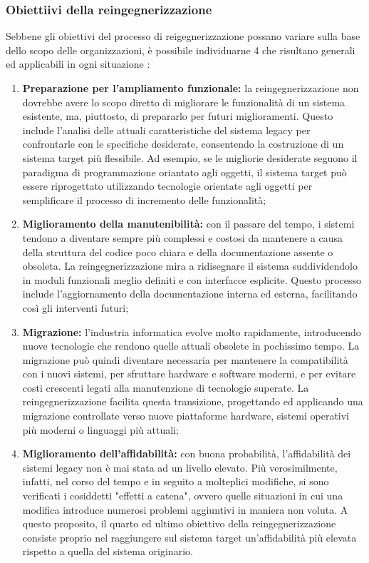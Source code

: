 \subsubsection{Obiettiivi della reingegnerizzazione}
Sebbene gli obiettivi del processo di reigegnerizzazione possano variare sulla base dello scopo delle organizzazioni, è possibile individuarne 4 che risultano generali ed applicabili in ogni situazione \cite{rosenberg1996software}:
\begin{enumerate}
  \item \textbf{Preparazione per l'ampliamento funzionale:} la reingegnerizzazione non dovrebbe avere lo scopo diretto di migliorare le funzionalità di un sistema esistente, ma, piuttosto, di prepararlo per futuri miglioramenti. Questo include l'analisi delle attuali caratteristiche del sistema legacy per confrontarle con le specifiche desiderate, consentendo la costruzione di un sistema target più flessibile. Ad esempio, se le migliorie desiderate seguono il paradigma di programmazione oriantato agli oggetti, il sistema target può essere riprogettato utilizzando tecnologie orientate agli oggetti per semplificare il processo di incremento delle funzionalità;

  \item \textbf{Miglioramento della manutenibilità:} con il passare del tempo, i sistemi tendono a diventare sempre più complessi e costosi da mantenere a causa della struttura del codice poco chiara e della documentazione assente o obsoleta. La reingegnerizzazione mira a ridisegnare il sistema suddividendolo in moduli funzionali meglio definiti e con interfacce esplicite. Questo processo include l'aggiornamento della documentazione interna ed esterna, facilitando così gli interventi futuri;

  \item \textbf{Migrazione:} l'industria informatica evolve molto rapidamente, introducendo nuove tecnologie che rendono quelle attuali obsolete in pochissimo tempo. La migrazione può quindi diventare necessaria per mantenere la compatibilità con i nuovi sistemi, per sfruttare hardware e software moderni, e per evitare costi crescenti legati alla manutenzione di tecnologie superate. La reingegnerizzazione facilita questa transizione, progettando ed applicando una migrazione controllate verso nuove piattaforme hardware, sistemi operativi più moderni o linguaggi più attuali;

  \item \textbf{Miglioramento dell'affidabilità:} con buona probabilità, l'affidabilità dei sistemi legacy non è mai stata ad un livello elevato. Più verosimilmente, infatti, nel corso del tempo e in seguito a molteplici modifiche, si sono verificati i cosiddetti "effetti a catena", ovvero quelle situazioni in cui una modifica introduce numerosi problemi aggiuntivi in maniera non voluta. A questo proposito, il quarto ed ultimo obiettivo della reingegnerizzazione consiste proprio nel raggiungere sul sistema target un'affidabilità più elevata rispetto a quella del sistema originario.
\end{enumerate}

